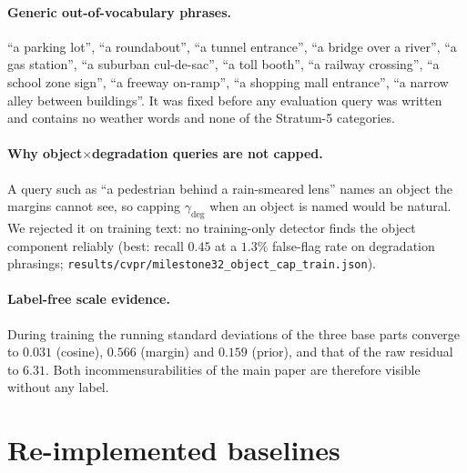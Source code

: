 \documentclass[10pt,letterpaper]{article}
\begin{document}
\paragraph{Generic out-of-vocabulary phrases.} ``a parking lot'', ``a roundabout'', ``a
tunnel entrance'', ``a bridge over a river'', ``a gas station'', ``a suburban
cul-de-sac'', ``a toll booth'', ``a railway crossing'', ``a school zone sign'',
``a freeway on-ramp'', ``a shopping mall entrance'', ``a narrow alley between
buildings''. It was fixed before any evaluation query was written and contains
no weather words and none of the Stratum-5 categories.

\paragraph{Why object$\times$degradation queries are not capped.} A query such as
``a pedestrian behind a rain-smeared lens'' names an object the margins cannot
see, so capping $\gamma_{\mathrm{deg}}$ when an object is named would be natural.
We rejected it on training text: no training-only detector finds the object
component reliably (best: recall $0.45$ at a $1.3\%$ false-flag rate on degradation
phrasings; \texttt{results/cvpr/milestone32\_object\_cap\_train.json}).

\paragraph{Label-free scale evidence.} During training the running standard
deviations of the three base parts converge to $0.031$ (cosine), $0.566$
(margin) and $0.159$ (prior), and that of the raw residual to $6.31$. Both incommensurabilities
of the main paper are therefore visible without any label.

\section{Re-implemented baselines}
\label{sec:baselines}
\end{document}
